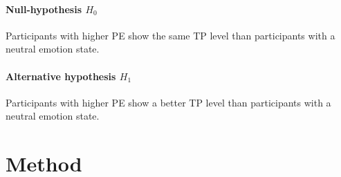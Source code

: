 \documentclass[	
	12pt, %
	a4paper, %
  abstracton
]{scrartcl}\usepackage[]{graphicx}\usepackage[]{color}
\begin{document}

\paragraph{Null-hypothesis \(H_0\)}
Participants with higher PE show the same TP level than participants with a neutral emotion state.
\paragraph{Alternative hypothesis \(H_1\)}
Participants with higher PE show a better TP level than participants with a neutral emotion state.


\section*{Method}





\end{document}
